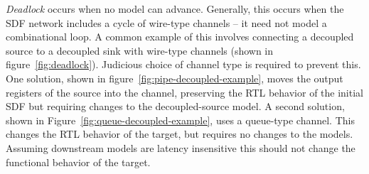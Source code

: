 \emph{Deadlock} occurs when no model can advance. Generally, this occurs when
the SDF network includes a cycle of wire-type channels -- it need not model a
combinational loop.  A common example of this involves connecting a decoupled
source to a decoupled sink with wire-type channels (shown in
figure~\ref{fig:deadlock}). Judicious choice of channel type is required to
prevent this. One solution, shown in figure~\ref{fig:pipe-decoupled-example},
moves the output registers of the source into the channel, preserving the RTL
behavior of the initial SDF but requiring changes to the decoupled-source
model.  A second solution, shown in Figure~\ref{fig:queue-decoupled-example},
uses a queue-type channel. This changes the RTL behavior of the target, but
requires no changes to the models.  Assuming downstream models are latency
insensitive this should not change the functional behavior of the target.



